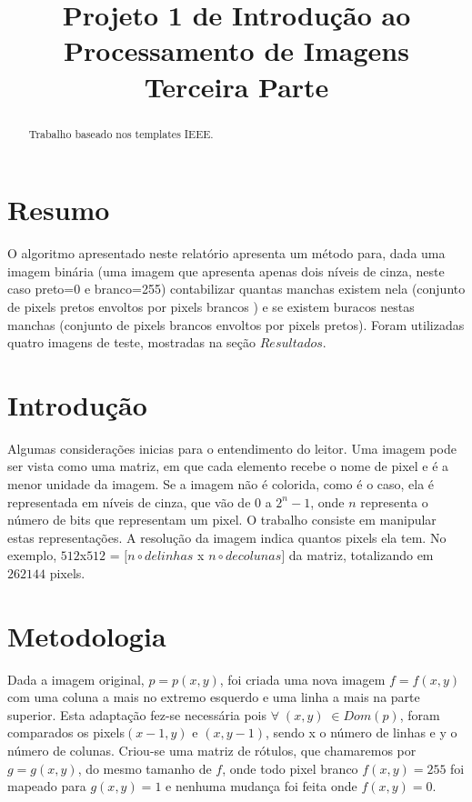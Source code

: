 \documentclass[conference]{IEEEtran}
\begin{document}
\title{Projeto 1 de Introdu\c{c}\~ao ao Processamento de Imagens \\ Terceira Parte}
\author{
}
\maketitle
\begin{abstract}
Trabalho baseado nos templates IEEE.
\end{abstract}
\section{Resumo}
\label{sec:intro} 
O algoritmo apresentado neste relat\'orio apresenta um m\'etodo para, dada uma imagem bin\'aria (uma imagem que apresenta apenas dois n\'iveis de cinza, neste caso preto=0 e branco=255) contabilizar quantas manchas existem nela (conjunto de pixels pretos envoltos por pixels brancos ) e se existem buracos nestas manchas (conjunto de pixels brancos envoltos por pixels pretos). Foram utilizadas quatro imagens de teste, mostradas na se\c{c}\~ao $Resultados$.

\section{ Introdu\c{c}\~ao} 
\label{sec:meth} 
Algumas considera\c{c}\~oes inicias para o entendimento do leitor. Uma imagem pode ser vista como uma matriz, em que cada elemento recebe o nome de pixel e \'e a menor unidade da imagem. Se a imagem  n\~ao \'e colorida, como \'e o caso, ela \'e representada em n\'iveis de cinza, que v\~ao de $0$  a $ 2^n-1$, onde $n$ representa o n\'umero de bits que representam um pixel. O trabalho consiste em manipular estas representa\c{c}\~oes. A resolu\c{c}\~ao da imagem indica quantos pixels ela tem. No exemplo, $512$x$512$ = $[n\circ  de  linhas$ x $ n\circ  de  colunas]$ da matriz, totalizando em $262144$ pixels. 
 
\section{Metodologia} 
\label{sec:meth} 
Dada a imagem original, $p=p(x,y) $, foi criada uma nova imagem $f=f(x,y) $ com uma coluna a mais no extremo esquerdo e uma linha a mais na parte superior. Esta adapta\c{c}\~ao fez-se necess\'aria pois $\forall\;(x,y)\;\in Dom(p) $, foram comparados os pixels$(x-1,y) $ e $(x,y-1) $, sendo x o n\'umero de linhas e y o n\'umero de colunas. Criou-se uma matriz de r\'otulos, que chamaremos por $g=g(x,y) $, do mesmo tamanho de $f$, onde todo pixel branco $f(x,y)=255 $ foi mapeado para $g(x,y)=1$ e nenhuma mudan\c{c}a foi feita onde $f(x,y)=0$.
\end{document}
